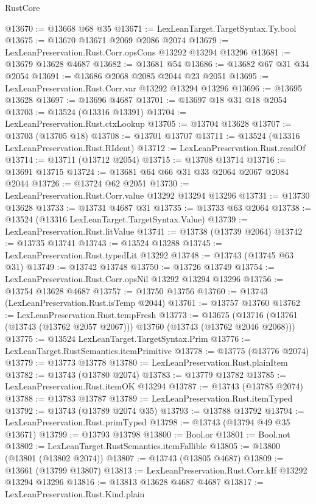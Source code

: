 \begin{lexlean}{RustCore}
\begin{coremodule}
@13670 := @13668 @68 @35
@13671 := LexLeanTarget.TargetSyntax.Ty.bool
@13675 := @13670 @13671 @2069 @2086 @2074
@13679 := LexLeanPreservation.Rust.Corr.opsCons @13292 @13294 @13296
@13681 := @13679 @13628 @4687
@13682 := @13681 @54
@13686 := @13682 @67 @31 @34 @2054
@13691 := @13686 @2068 @2085 @2044 @23 @2051
@13695 := LexLeanPreservation.Rust.Corr.var @13292 @13294 @13296
@13696 := @13695 @13628
@13697 := @13696 @4687
@13701 := @13697 @18 @31 @18 @2054
@13703 := @13524 (@13316 @13391)
@13704 := LexLeanPreservation.Rust.ctxLookup
@13705 := @13704 @13628
@13707 := @13703 (@13705 @18)
@13708 := @13701 @13707
@13711 := @13524 (@13316 LexLeanPreservation.Rust.RIdent)
@13712 := LexLeanPreservation.Rust.readOf
@13714 := @13711 (@13712 @2054)
@13715 := @13708 @13714
@13716 := @13691 @13715
@13724 := @13681 @64 @66 @31 @33 @2064 @2067 @2084 @2044
@13726 := @13724 @62 @2051
@13730 := LexLeanPreservation.Rust.Corr.value @13292 @13294 @13296
@13731 := @13730 @13628
@13733 := @13731 @4687 @31
@13735 := @13733 @63 @2064
@13738 := @13524 (@13316 LexLeanTarget.TargetSyntax.Value)
@13739 := LexLeanPreservation.Rust.litValue
@13741 := @13738 (@13739 @2064)
@13742 := @13735 @13741
@13743 := @13524 @13288
@13745 := LexLeanPreservation.Rust.typedLit @13292
@13748 := @13743 (@13745 @63 @31)
@13749 := @13742 @13748
@13750 := @13726 @13749
@13754 := LexLeanPreservation.Rust.Corr.opsNil @13292 @13294 @13296
@13756 := @13754 @13628 @4687
@13757 := @13750 @13756
@13760 := @13743 (LexLeanPreservation.Rust.isTemp @2044)
@13761 := @13757 @13760
@13762 := LexLeanPreservation.Rust.tempFresh
@13773 := @13675
    (@13716 (@13761 (@13743 (@13762 @2057 @2067))) @13760 (@13743 (@13762 @2046 @2068)))
@13775 := @13524 LexLeanTarget.TargetSyntax.Prim
@13776 := LexLeanTarget.RustSemantics.itemPrimitive
@13778 := @13775 (@13776 @2074)
@13779 := @13773 @13778
@13780 := LexLeanPreservation.Rust.plainItem
@13782 := @13743 (@13780 @2074)
@13783 := @13779 @13782
@13785 := LexLeanPreservation.Rust.itemOK @13294
@13787 := @13743 (@13785 @2074)
@13788 := @13783 @13787
@13789 := LexLeanPreservation.Rust.itemTyped
@13792 := @13743 (@13789 @2074 @35)
@13793 := @13788 @13792
@13794 := LexLeanPreservation.Rust.primTyped
@13798 := @13743 (@13794 @49 @35 @13671)
@13799 := @13793 @13798
@13800 := Bool.or
@13801 := Bool.not
@13802 := LexLeanTarget.RustSemantics.itemFallible
@13805 := @13800 (@13801 (@13802 @2074))
@13807 := @13743 (@13805 @4687)
@13809 := @13661 (@13799 @13807)
@13813 := LexLeanPreservation.Rust.Corr.kIf @13292 @13294 @13296
@13816 := @13813 @13628 @4687 @4687
@13817 := LexLeanPreservation.Rust.Kind.plain

\end{coremodule}
\end{lexlean}
